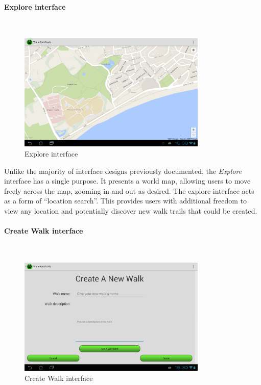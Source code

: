 \documentclass[11pt,a4paper]{report}
\begin{document}
\paragraph*{Explore interface}\mbox{}\\
\begin{figure}[H]
    \centering
    \includegraphics[width=0.8\textwidth]{chris/explore}
    \caption{Explore interface}
    \label{fig:explore_view}
\end{figure}

Unlike the majority of interface designs previously documented, the \emph{Explore} interface has a single purpose. It presents a world map, allowing users to move freely across the map, zooming in and out as desired. The explore interface acts as a form of ``location search''. This provides users with additional freedom to view any location and potentially discover new walk trails that could be created.

\paragraph*{Create Walk interface}\mbox{}\\
\begin{figure}[H]
    \centering
    \includegraphics[width=0.8\textwidth]{chris/create_walk}
    \caption{Create Walk interface}
    \label{fig:create_walk}
\end{figure}
\end{document}
